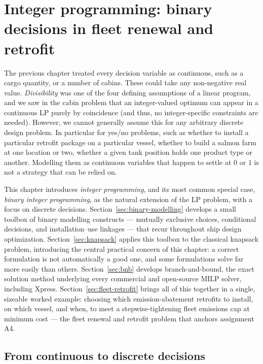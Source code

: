 \chapter{Integer programming: binary decisions in fleet renewal and retrofit}
\label{ch:ip-intro}

The previous chapter treated every decision variable as continuous, such as a
cargo quantity, or a number of cabins. These could take any non-negative real
value. \emph{Divisibility} was one of the four defining assumptions of a
linear program, and we saw in the cabin
problem that an integer-valued optimum can appear in a continuous LP
purely by coincidence (and thus, no integer-specific constraints are needed). 
However, we cannot generally assume this for any arbitrary discrete design problem. 
In particular for yes/no problems, such as whether to install a particular retrofit package on a
particular vessel, whether to build a salmon farm at one location or two, whether
a given tank position holds one product type or another. Modelling them as continuous variables that happen to
settle at $0$ or $1$ is not a strategy that can be relied on.

This chapter introduces \emph{integer programming}, and its most common
special case, \emph{binary integer programming}, as the natural extension
of the LP problem, with a focus on discrete decisions.
Section~\ref{sec:binary-modelling} develops a small toolbox of binary
modelling constructs --- mutually exclusive choices, conditional
decisions, and installation--use linkages --- that recur throughout ship
design optimization. Section~\ref{sec:knapsack} applies this toolbox to
the classical knapsack problem, introducing the central practical concern
of this chapter: a correct formulation is not automatically a good one,
and some formulations solve far more easily than others.
Section~\ref{sec:bnb} develops branch-and-bound, the exact solution method
underlying every commercial and open-source MILP solver, including
Xpress. Section~\ref{sec:fleet-retrofit} brings all of this together in a
single, sizeable worked example: choosing which emission-abatement
retrofits to install, on which vessel, and when, to meet a
stepwise-tightening fleet emissions cap at minimum cost --- the fleet
renewal and retrofit problem that anchors assignment A4.

\section{From continuous to discrete decisions}
\label{sec:ip-intro-sec}

